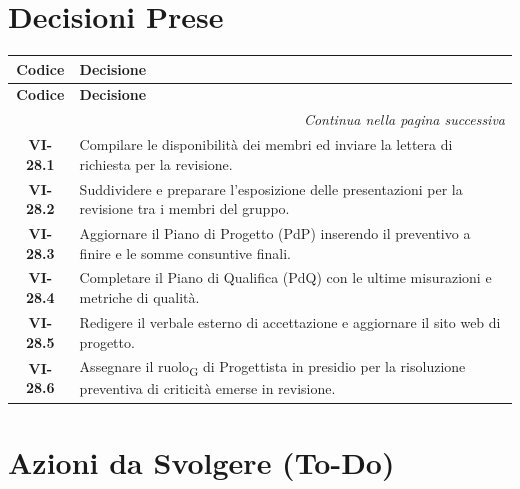 \section{Decisioni Prese}

\renewcommand{\arraystretch}{1.3}
\vspace{-0.3cm}
\noindent
\begin{longtable}{c p{12cm}}
\toprule
\textbf{Codice} & \textbf{Decisione} \\
\midrule
\endfirsthead

\toprule
\textbf{Codice} & \textbf{Decisione} \\
\midrule
\endhead

\midrule
\multicolumn{2}{r}{\textit{Continua nella pagina successiva}} \\
\midrule
\endfoot

\bottomrule
\endlastfoot

\textbf{VI-28.1} & {Compilare le disponibilità dei membri ed inviare la lettera di richiesta per la revisione.} \\
\textbf{VI-28.2} & {Suddividere e preparare l'esposizione delle presentazioni per la revisione tra i membri del gruppo.} \\
\textbf{VI-28.3} & {Aggiornare il Piano di Progetto (PdP) inserendo il preventivo a finire e le somme consuntive finali.} \\
\textbf{VI-28.4} & {Completare il Piano di Qualifica (PdQ) con le ultime misurazioni e metriche di qualità.} \\
\textbf{VI-28.5} & {Redigere il verbale esterno di accettazione e aggiornare il sito web di progetto.} \\
\textbf{VI-28.6} & {Assegnare il ruolo\textsubscript{G} di Progettista in presidio per la risoluzione preventiva di criticità emerse in revisione.} \\
\end{longtable}


\section{Azioni da Svolgere (To-Do)}

